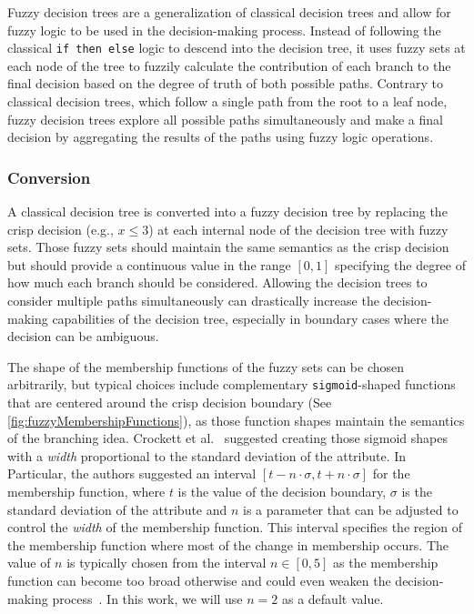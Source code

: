Fuzzy decision trees are a generalization of classical decision trees and allow for fuzzy logic to be used in the decision-making process. Instead of following the classical \texttt{if then else} logic to descend into the decision tree, it uses fuzzy sets at each node of the tree to fuzzily calculate the contribution of each branch to the final decision based on the degree of truth of both possible paths. Contrary to classical decision trees, which follow a single path from the root to a leaf node, fuzzy decision trees explore all possible paths simultaneously and make a final decision by aggregating the results of the paths using fuzzy logic operations.

\subsubsection{Conversion}


A classical decision tree is converted into a fuzzy decision tree by replacing the crisp decision (e.g., $x \leq 3$) at each internal node of the decision tree with fuzzy sets. Those fuzzy sets should maintain the same semantics as the crisp decision but should provide a continuous value in the range $[0,1]$ specifying the degree of how much each branch should be considered. Allowing the decision trees to consider multiple paths simultaneously can drastically increase the decision-making capabilities of the decision tree, especially in boundary cases where the decision can be ambiguous.


The shape of the membership functions of the fuzzy sets can be chosen arbitrarily, but typical choices include complementary \texttt{sigmoid}-shaped functions that are centered around the crisp decision boundary (See \autoref{fig:fuzzyMembershipFunctions}), as those function shapes maintain the semantics of the branching idea. Crockett et al.~\cite{CROCKETT20062809} suggested creating those sigmoid shapes with a \emph{width} proportional to the standard deviation of the attribute. In Particular, the authors suggested an interval $[t-n\cdot \sigma, t+n\cdot \sigma]$ for the membership function, where  $t$ is the value of the decision boundary, $\sigma$ is the standard deviation of the attribute and $n$ is a parameter that can be adjusted to control the \emph{width} of the membership function. This interval specifies the region of the membership function where most of the change in membership occurs. The value of $n$ is typically chosen from the interval $n\in [0,5]$ as the membership function can become too broad otherwise and could even weaken the decision-making process~\cite{CROCKETT20062809}. In this work, we will use $n=2$ as a default value.

